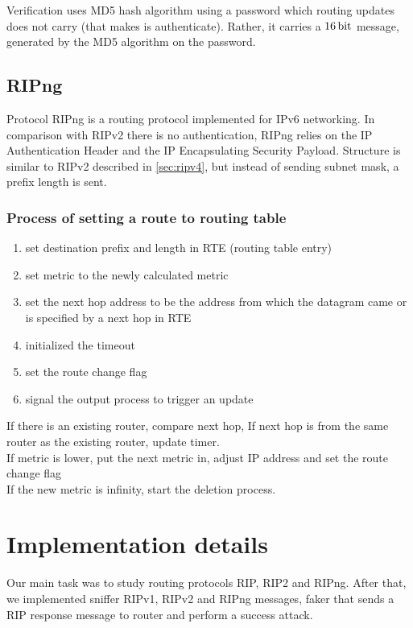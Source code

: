 \documentclass[11pt,a4paper]{article}
\begin{document}
\noindent
Verification uses MD5 hash algorithm using a password which routing updates does not carry (that makes is authenticate). Rather, it carries a $\SI{16}{\bit}$ message, generated by the MD5 algorithm on the password.


\subsection{RIPng}
Protocol RIPng is a routing protocol implemented for IPv6 networking. In comparison with RIPv2 there is no authentication, RIPng relies on the IP Authentication Header\cite{ip_header} and the IP Encapsulating Security Payload\cite{payload}\cite{ripng}. Structure is similar to RIPv2 described in \ref{sec:ripv4}, but instead of sending subnet mask, a prefix length is sent. 

\subsubsection{Process of setting a route to routing table}
\begin{enumerate}
\item set destination prefix and length in RTE (routing table entry)
\item set metric to the newly calculated metric
\item set the next hop address to be the address from which the datagram came or is specified by a next hop in RTE
\item initialized the timeout
\item set the route change flag
\item signal the output process to trigger an update
\end{enumerate}

\noindent
If there is an existing router, compare next hop, If next hop is from the same router as the existing router, update timer.\\
If metric is lower, put the next metric in, adjust IP address and set the route change flag\\
If the new metric is infinity, start the deletion process\cite{ripng}.


\section{Implementation details}
Our main task was to study routing protocols RIP, RIP2 and RIPng. After that, we implemented sniffer RIPv1, RIPv2 and RIPng messages, faker that sends a RIP response message to router and perform a success attack.
\end{document}
